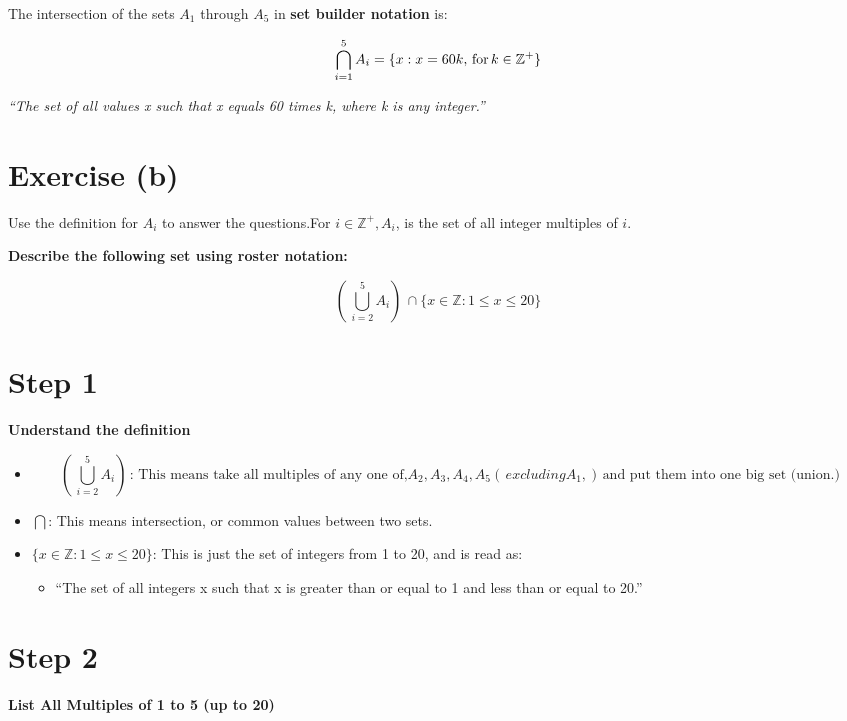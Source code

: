 \documentclass[
  letterpaper,
  DIV=11,
  numbers=noendperiod]{scrreprt}
\providecommand{\tightlist}{%
  \setlength{\itemsep}{0pt}\setlength{\parskip}{0pt}}
\begin{document}
The intersection of the sets \(A_1\) through \(A_5\) in {\textbf{set
builder notation}} is:

\[
\bigcap_{i=1}^5 A_i = \{ x:x=60k,\thinspace \text{for} \thinspace k \in \mathbb{Z^+} \}
\]

{\emph{``The set of all values x such that x equals 60 times k, where k
is any integer.''}}

\section{Exercise (b)}

Use the definition for \(A_i\) to answer the questions.For
\(i \in \mathbb{Z^+}, A_i\), is the set of all integer multiples of
\(i\).

\textbf{Describe the following set using roster notation:}

\[( \,\bigcup^5_{i=2} A_i) \, \cap \{ x \in \mathbb{Z}:1 \leq x \leq 20 \}\]

\section{Step 1}

\textbf{Understand the definition}

\begin{itemize}
\item
  \[
  ( \,\bigcup^5_{i=2} A_i) \, \text{: This means take all multiples of any one of,} A_2, A_3, A_4, A_5 ( \, excluding A_1, ) \, \text{and put them into one big set (union.)}\]
\item
  \(\bigcap\): This means intersection, or common values between two
  sets.
\item
  \(\{ x \in \mathbb{Z}:1 \leq x \leq 20 \}\): This is just the set of
  integers from 1 to 20, and is read as:

  \begin{itemize}
  \tightlist
  \item
    {``The set of all integers x such that x is greater than or equal to
    1 and less than or equal to 20.''}
  \end{itemize}
\end{itemize}

\section{Step 2}

\textbf{List All Multiples of 1 to 5 (up to 20)}
\end{document}
